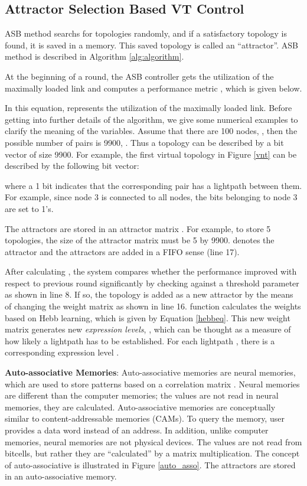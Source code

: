 \documentclass[conference]{IEEEtran}
\begin{document}
\subsection{Attractor Selection Based VT Control}\label{attbasedVNT}
ASB method searchs for topologies randomly, and if a satisfactory topology is found, it is 
saved in a memory. This saved topology is called an ``attractor''.
ASB method is described in Algorithm \ref{alg:algorithm}.


 At the beginning of a round, the ASB controller 
 gets the utilization of the maximally loaded link and computes a performance  metric , which is given below.
   
In this equation,  represents the utilization of the maximally loaded link.
Before getting  into further details of the algorithm, we give some  numerical examples to clarify the meaning of the variables.
 Assume that there are 100 nodes, , then the possible number of pairs is 9900, . Thus a topology can be described by a bit vector of size 9900.
For example, the first virtual topology in Figure \ref{vnt} can be described by the following bit vector:

where a 1 bit indicates that the corresponding pair has a lightpath between them. For example, since node 3 is connected to all nodes, the bits belonging to node 3 are set to 1's.
 
The attractors are stored in an attractor matrix .
For example, to store 5 topologies, the size of the attractor matrix  must be 5 by 9900. 
 denotes the  attractor and the attractors are added in a FIFO sense (line 17).

After calculating , the system compares whether the performance improved with respect to previous round significantly 
by checking against a threshold parameter  as shown in line 8. 
If so, the topology is added as a new attractor by the means of changing the weight matrix as shown in line 16.  function
calculates the weights based on Hebb learning, which is given by Equation \ref{hebbeq}.
This new weight matrix generates new {\em expression levels}, , which can be thought as a measure of how likely a lightpath has to be established.
For each lightpath , there is a corresponding expression level .

{\bf Auto-associative Memories}:
Auto-associative memories are neural memories, which are used to store patterns  based on a correlation matrix \cite{Kohonen:CMM72}.  
Neural memories are different than the computer memories; the values are not read in neural memories, they are calculated.
Auto-associative memories are conceptually similar to content-addressable memories (CAMs). 
To query the memory, user provides a data word instead of an address.
In addition, unlike computer memories, neural memories are not physical devices. 
The values are not read from bitcells,  but rather they are ``calculated'' by a matrix multiplication.
The concept of auto-associative is illustrated in Figure \ref{auto_asso}.
  The attractors are stored in an auto-associative memory.
  
\end{document}
